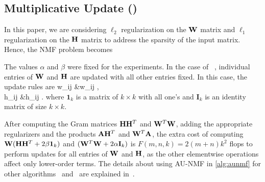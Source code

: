 


\subsection{Multiplicative Update (\MU)}
\label{sec:sparsenmfmu}

In this paper, we are considering $\ell_2$ regularization on the $\mathbf{W}$ matrix and $\ell_1$ regularization on the $\mathbf{H}$ matrix to address the sparsity of the input matrix. Hence, the NMF problem becomes

The values $\alpha$ and $\beta$ were fixed for the experiments. 
In the case of \MU\ \cite{seung2001algorithms}, individual entries of $\mathbf{W}$ and $\mathbf{H}$ are updated with all other entries fixed.
In this case, the update rules are 
\SplitN{\label{eqn:muupdate}} {
w_{ij} &\leftarrow w_{ij} , \\
h_{ij} &\leftarrow  h_{ij} .
} 
where $\mathbf{1}_k$ is a matrix of $k \times k$ with all one's and $\mathbf{I}_k$ is an identity matrix of size $k \times k$. 

After computing the Gram matrices $\mathbf{H}\mathbf{H}^T$ and $\mathbf{W}^T \mathbf{W}$, adding the appropriate regularizers and the products $\mathbf{A}\mathbf{H}^T$ and $\mathbf{W}^T\mathbf{A}$, the extra cost of computing $\mathbf{W} (\mathbf{H} \mathbf{H}^T+ 2\beta \mathbf{1}_k)$ and $(\mathbf{W}^T \mathbf{W}+ 2\alpha\mathbf{I}_k)$ is $F(m,n,k)=2(m+n)k^2$ flops to perform updates for all entries of $\mathbf{W}$ and $\mathbf{H}$, as the other elementwise operations affect only lower-order terms.
The details about using AU-NMF in \cref{alg:aunmf} for other algorithms \HALS\ and \BPP\ are explained in~\cite{KBP16,KBP16MPIFAUN}. 

